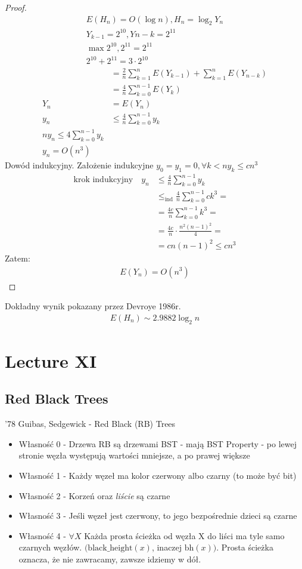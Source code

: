 \documentclass{article}
\numberwithin{equation}{subsection}
\begin{document}
\begin{proof}
\begin{align}
    E(H_n) = O(\log n), H_n = \log_2 Y_n \\
    Y_{k-1} = 2^10, Y{n-k} = 2^11\\
    \max{2^{10},2^{11}} = 2^{11}\\
    2^{10}+2^{11} = 3\cdot 2^{10}
\end{align}
\begin{align}
    &= \frac{2}{n} \sum_{k=1}^{n} E(Y_{k-1}) + \sum_{k=1}^{n} E(Y_{n-k})\\
    &= \frac{4}{n} \sum_{k=0}^{n-1} E(Y_{k})\\
    Y_n &= E(Y_n)\\
    y_n &\leq \frac{4}{n} \sum_{k=0}^{n-1} y_k\\
    ny_n \leq 4 \sum_{k=0}^{n-1} y_k\\
    y_n = O(n^3)
\end{align}
Dowód indukcyjny. Założenie indukcyjne $y_0=y_1=0, \forall k<n y_k \leq cn^3$
\begin{align}
   \text{krok indukcyjny}\quad
   y_n &\leq \frac{4}{n} \sum_{k=0}^{n-1} y_k\\
   &\leq_{\text{ind}} \frac{4}{n} \sum_{k=0}^{n-1} ck^3 =\\
   &=\frac{4c}{n}\sum_{k=0}^{n-1} k^3=\\
   &=\frac{4c}{n} \cdot \frac{n^2(n-1)^2}{4}=\\
   &=cn(n-1)^2 \leq cn^3
\end{align}
Zatem:
\begin{align}
    E(Y_n) = O(n^3)
\end{align}
\end{proof}
Dokładny wynik pokazany przez Devroye 1986r.
\begin{align}
    E(H_n) \sim 2.9882\log_2 n
\end{align}

\section{Lecture XI}

\subsection{Red Black Trees}

'78 Guibas, Sedgewick - Red Black (RB) Trees 
\begin{itemize}
    \item Własność 0 - Drzewa RB są drzewami BST - mają BST Property - po lewej stronie węzła występują wartości mniejsze, a po prawej większe
    \item Własność 1 - Każdy węzeł ma kolor czerwony albo czarny (to może być bit)
    \item Własność 2 - Korzeń oraz \textit{liście} są czarne
    \item Własność 3 - Jeśli węzeł jest czerwony, to jego bezpośrednie dzieci są czarne
    \item Własność 4 - $\forall X$ Każda prosta ścieżka od węzła X do liści ma tyle samo czarnych węzłów. $(\text{black\_height}(x)$, inaczej $ \text{bh}(x))$. Prosta ścieżka oznacza, że nie zawracamy, zawsze idziemy w dół.
\end{itemize}
\end{document}
